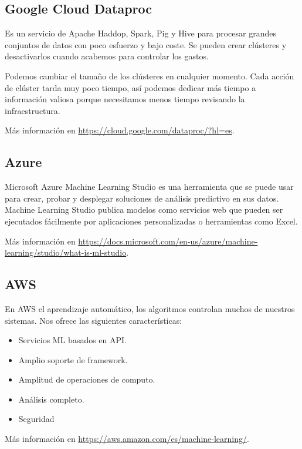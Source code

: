\subsection{Google Cloud Dataproc}
Es un servicio de Apache Haddop, Spark, Pig y Hive para procesar grandes conjuntos de datos con poco esfuerzo y bajo coste. Se pueden crear clústeres y desactivarlos cuando acabemos para  controlar los gastos.

Podemos cambiar el tamaño de los clústeres en cualquier momento. Cada acción de clúster tarda muy poco tiempo, así podemos dedicar más tiempo a información valiosa porque necesitamos menos tiempo revisando la infraestructura.

Más información en \url{https://cloud.google.com/dataproc/?hl=es}.

\subsection{Azure}
Microsoft Azure Machine Learning Studio es una herramienta que se puede usar para crear, probar y desplegar soluciones de análisis predictivo en sus datos. Machine Learning Studio publica modelos como servicios web que pueden ser ejecutados fácilmente por aplicaciones personalizadas o herramientas como Excel.

Más información en \url{https://docs.microsoft.com/en-us/azure/machine-learning/studio/what-is-ml-studio}.

\subsection{AWS}
En AWS el aprendizaje automático, los algoritmos controlan muchos de nuestros sistemas. Nos ofrece las siguientes características:
\begin{itemize}
	\item Servicios ML basados en API.
	\item Amplio soporte de framework.
	\item Amplitud de operaciones de computo.
	\item Análisis completo.
	\item Seguridad
\end{itemize}

Más información en \url{https://aws.amazon.com/es/machine-learning/}.	